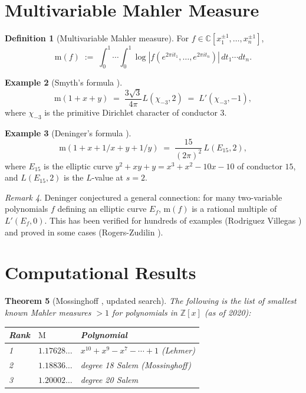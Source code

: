 \documentclass[12pt,a4paper]{amsart}
\newtheorem{theorem}{Theorem}[section]
\theoremstyle{definition}
\newtheorem{definition}[theorem]{Definition}
\newtheorem{example}[theorem]{Example}
\theoremstyle{remark}
\newtheorem{remark}[theorem]{Remark}
\newcommand{\Z}{\mathbb{Z}}
\newcommand{\C}{\mathbb{C}}
\newcommand{\M}{\mathrm{M}}
\newcommand{\m}{\mathrm{m}}
\begin{document}
\section{Multivariable Mahler Measure}\label{sec:multivariable}

\begin{definition}[Multivariable Mahler measure]
  For $f \in \C[x_1^{\pm 1},\ldots,x_n^{\pm 1}]$,
  \[
    \m(f) \;:=\; \int_0^1\cdots\int_0^1
    \log|f(e^{2\pi it_1},\ldots,e^{2\pi it_n})|\,dt_1\cdots dt_n.
  \]
\end{definition}

\begin{example}[Smyth's formula \cite{Smyth1981}]
  \[
    \m(1+x+y) \;=\; \frac{3\sqrt{3}}{4\pi} L(\chi_{-3}, 2)
                 \;=\; L'(\chi_{-3}, -1),
  \]
  where $\chi_{-3}$ is the primitive Dirichlet character of conductor $3$.
\end{example}

\begin{example}[Deninger's formula \cite{Deninger1997}]
  \[
    \m(1+x+1/x+y+1/y) \;=\; \frac{15}{(2\pi)^2}\, L(E_{15}, 2),
  \]
  where $E_{15}$ is the elliptic curve $y^2 + xy + y = x^3 + x^2 - 10x - 10$
  of conductor $15$, and $L(E_{15}, 2)$ is the $L$-value at $s=2$.
\end{example}

\begin{remark}
  Deninger \cite{Deninger1997} conjectured a general connection: for many two-variable
  polynomials $f$ defining an elliptic curve $E_f$, $\m(f)$ is a rational multiple of
  $L'(E_f, 0)$. This has been verified for hundreds of examples (Rodriguez Villegas
  \cite{RV1999}) and proved in some cases (Rogers-Zudilin \cite{RZ2012}).
\end{remark}

\section{Computational Results}\label{sec:computations}

\begin{theorem}[Mossinghoff \cite{Mossinghoff1998}, updated search]
  The following is the list of smallest known Mahler measures $> 1$ for polynomials in
  $\Z[x]$ (as of 2020):
  \begin{center}
    \begin{tabular}{lll}
      \toprule
      Rank & $\M$ & Polynomial \\
      \midrule
      1 & $1.17628\ldots$ & $x^{10}+x^9-x^7-\cdots+1$ (Lehmer) \\
      2 & $1.18836\ldots$ & degree 18 Salem (Mossinghoff) \\
      3 & $1.20002\ldots$ & degree 20 Salem \\
      \bottomrule
    \end{tabular}
  \end{center}
\end{theorem}
\end{document}
